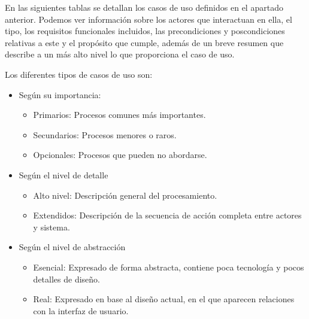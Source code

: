 En las siguientes tablas se detallan los casos de uso definidos en el apartado anterior. Podemos ver información sobre
los actores que interactuan en ella, el tipo, los requisitos funcionales incluidos, las precondiciones y
poscondiciones relativas a este y el propósito que cumple, además de un breve resumen que describe a un más alto
nivel lo que proporciona el caso de uso.

Los diferentes tipos de casos de uso son:

\begin{itemize}
    \item Según su importancia:
    \begin{itemize}
        \item Primarios: Procesos comunes más importantes.
        \item Secundarios: Procesos menores o raros.
        \item Opcionales: Procesos que pueden no abordarse.
    \end{itemize}

    \item Según el nivel de detalle
    \begin{itemize}
        \item Alto nivel: Descripción general del procesamiento.
        \item Extendidos: Descripción de la secuencia de acción completa entre actores y sistema.
    \end{itemize}

    \item Según el nivel de abstracción
    \begin{itemize}
        \item Esencial: Expresado de forma abstracta, contiene poca tecnología y pocos detalles de diseño.
        \item Real: Expresado en base al diseño actual, en el que aparecen relaciones con la interfaz de usuario.
    \end{itemize}
\end{itemize}


